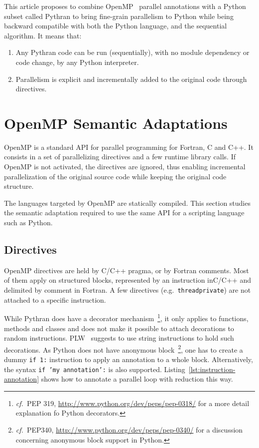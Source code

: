 \documentclass{llncs}
\newcommand\see{\emph{cf.\ }}
\begin{document}
This article proposes to combine OpenMP~\cite{openmp3.1} parallel annotations
with a Python subset called Pythran to bring fine-grain parallelism to Python
while being backward compatible with both the Python language, and the
sequential algorithm. It means that:
\begin{enumerate}
    \item Any Pythran code can be run (sequentially), with no module dependency or code change,
        by any Python interpreter.
    \item Parallelism is explicit and incrementally added to the original code
        through directives.
\end{enumerate}

\section{OpenMP Semantic Adaptations}\label{sec:python-openmp}

OpenMP is a standard API for parallel programming for Fortran, C and C++. It
consists in a set of parallelizing directives and a few runtime library calls.
If OpenMP is not activated, the directives are ignored, thus enabling
incremental parallelization of the original source code while keeping the
original code structure.

The languages targeted by OpenMP are statically compiled. This section studies
the semantic adaptation required to use the same API for a scripting language
such as Python.

\subsection{Directives}

OpenMP directives are held by C/C++ pragma, or by Fortran comments. Most of them apply
on structured blocks, represented by an instruction inC/C++ and delimited by
comment in Fortran. A few directives (e.g.\ \texttt{threadprivate}) are not
attached to a specific instruction.

While Pythran does have a decorator mechanism~\footnote{\see PEP 319,
\url{http://www.python.org/dev/peps/pep-0318/} for a more detail explanation fo
Python decorators.}, it only applies to functions, methods and classes and does
not make it possible to attach decorations to random instructions.
PLW~\cite{dongara2007} suggests to use string instructions to hold such
decorations. As Python does not have anonymous block~\footnote{\see PEP340,
    \url{http://www.python.org/dev/peps/pep-0340/} for a discussion concerning
anonymous block support in Python.}, one has to create a dummy \texttt{if 1:}
instruction to apply an annotation to a whole block. Alternatively, the syntax
\texttt{if 'my annotation':} is also supported.
Listing~\ref{lst:instruction-annotation} shows how to annotate a parallel loop
with reduction this way.
\end{document}
